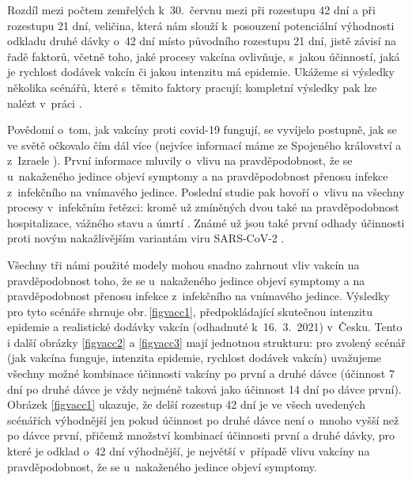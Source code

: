 
Rozdíl mezi počtem zemřelých k~30.\ červnu mezi při rozestupu 42 dní a při rozestupu 21 dní, veličina, která nám slouží k~posouzení potenciální výhodnosti odkladu druhé dávky o~42 dní místo původního rozestupu 21 dní, jistě závisí na řadě faktorů, včetně toho, jaké procesy vakcína ovlivňuje, s~jakou účinností, jaká je rychlost dodávek vakcín či jakou intenzitu má epidemie. Ukážeme si výsledky několika scénářů, které s~těmito faktory pracují; kompletní výsledky pak lze nalézt v~práci \cite{vaccpaper}.

Povědomí o~tom, jak vakcíny proti covid-19 fungují, se vyvíjelo postupně, jak se ve světě očkovalo čím dál více (nejvíce informací máme ze Spojeného království \cite{Hall_etal2021,Vasileiou_etal2021} a z~Izraele \cite{Haas_etal2021}). První informace mluvily o~vlivu na pravděpodobnost, že se u~nakaženého jedince objeví symptomy a na pravděpodobnost přenosu infekce z~infekčního na vnímavého jedince. Poslední studie pak hovoří o~vlivu na všechny procesy v~infekčním řetězci: kromě už zmíněných dvou také na pravděpodobnost hospitalizace, vážného stavu a úmrtí \cite{Haas_etal2021}. Známé už jsou také první odhady účinnosti proti novým nakažlivějším variantám viru SARS-CoV-2 \cite[a reference uvnitř]{Shapiro_etal2021,delta}. 

Všechny tři námi použité modely mohou snadno zahrnout vliv vakcín na pravděpodobnost toho, že se u~nakaženého jedince objeví symptomy a na pravděpodobnost přenosu infekce z~infekčního na vnímavého jedince. Výsledky pro tyto scénáře shrnuje obr.\,\ref{figvacc1}, předpokládající skutečnou intenzitu epidemie a realistické dodávky vakcín (odhadnuté k~16.\ 3.\ 2021) v~Česku. Tento i další obrázky \ref{figvacc2} a \ref{figvacc3} mají jednotnou strukturu: pro zvolený scénář (jak vakcína funguje, intenzita epidemie, rychlost dodávek vakcín) uvažujeme všechny možné kombinace účinnosti vakcíny po první a druhé dávce (účinnost 7 dní po druhé dávce je vždy nejméně taková jako účinnost 14 dní po dávce první). Obrázek \ref{figvacc1} ukazuje, že delší rozestup 42 dní je ve všech uvedených scénářích výhodnější jen pokud účinnost po druhé dávce není o~mnoho vyšší než po dávce první, přičemž množství kombinací účinnosti první a druhé dávky, pro které je odklad o~42 dní výhodnější, je největší v~případě vlivu vakcíny na pravděpodobnost, že se u~nakaženého jedince objeví symptomy.

